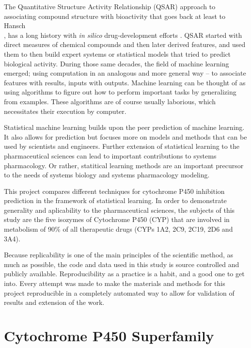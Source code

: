 The Quantitative Structure Activity Relationship (QSAR) approach to associating compound structure with bioactivity that goes back at least to Hansch\\ \cite{Hansch1964}, has a long history with \textit{in silico} drug-development efforts . QSAR started with direct measures of chemical compounds and then later derived features, and used them to then build expert systems or statistical models that tried to predict biological activity. During those same decades, the field of machine learning emerged; using computation in an analogous and more general way -- to associate features with results, inputs with outputs. Machine learning can be thought of as using algorithms to figure out how to perform important tasks by generalizing from examples. These algorithms are of course usually laborious, which necessitates their execution by computer.

Statistical machine learning builds upon the peer prediction of machine learning. It also allows for prediction but focuses more on models and methods that can be used by scientists and engineers. \cite{James2013} Further extension of statistical learning to the pharmaceutical sciences can lead to important contributions to systems pharmacology. Or rather, statitical learning methods are an important precursor to the needs of systems biology and systems pharmacology modeling.

This project compares different techniques for cytochrome P450 inhibition prediction in the framework of statistical learning. In order to demonstrate generality and aplicability to the pharmaceutical sciences, the subjects of this study are the five isozymes of Cytochrome P450 (CYP) that are involved in metabolism of 90\% of all therapeutic drugs (CYPs 1A2, 2C9, 2C19, 2D6 and 3A4).

Because replicability is one of the main principles of the scientific method, as much as possible, the code and data used in this study is source controlled and publicly available. Reproducibility as a practice is a habit, and a good one to get into. Every attempt was made to make the materials and methods for this project reproducible in a completely automated way to allow for validation of results and extension of the work.

\section{Cytochrome P450 Superfamily}

